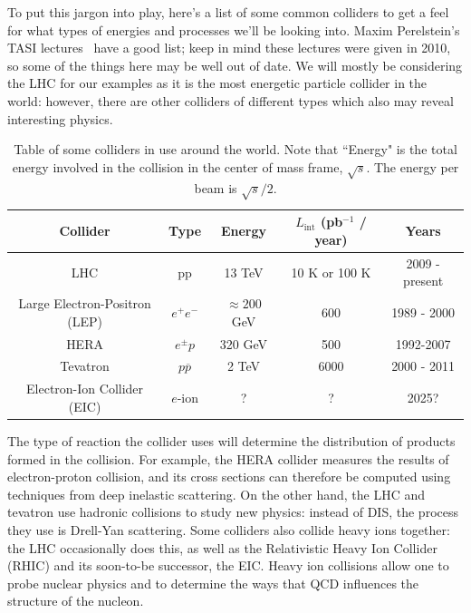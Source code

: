 \documentclass[11pt, oneside]{article}   	%
\theoremstyle{definition}
\numberwithin{equation}{subsection}		%
\begin{document}
To put this jargon into play, here's a list of some common colliders to get a feel for what types of energies and processes 
we'll be looking into. Maxim Perelstein's TASI lectures~\cite{perelstein} have a good list; keep in mind these lectures were given in 2010, so 
some of the things here may be well out of date. We will mostly be considering the LHC for our examples as it is the most energetic 
particle collider in the world: however, there are other colliders of different types which also may reveal interesting physics.
\begin{table}[H]
	\centering
	\begin{tabular}{ | c | c | c | c | c | }
		\hline
		Collider & Type & Energy & $L_\mathrm{int}$ (pb$^{-1}$ / year) & Years \\
		\hline
		LHC & pp & 13 TeV & 10 K or 100 K & 2009 - present \\
		\hline
		Large Electron-Positron (LEP) & $e^+ e^-$ & $\approx 200$ GeV & 600 & 1989 - 2000 \\
		\hline
		HERA & $e^\pm p$ & 320 GeV & 500 & 1992-2007 \\
		\hline
		Tevatron & $p\overline p$ & 2 TeV & 6000 & 2000 - 2011 \\
		\hline
		Electron-Ion Collider (EIC) & $e$-ion & ? & ? & 2025? \\
		\hline
	\end{tabular}
	\caption{Table of some colliders in use around the world. Note that ``Energy" is the total energy involved in the collision in the 
	center of mass frame, $\sqrt s$. The energy per beam is $\sqrt s / 2$.}
	\label{table:colliders}
\end{table}

The type of reaction the collider uses will determine the distribution of products formed in the collision. For example, the HERA collider 
measures the results of electron-proton collision, and its cross sections can therefore be computed using techniques from deep inelastic 
scattering. On the other hand, the LHC and tevatron use hadronic collisions to study new physics: instead of DIS, the process they 
use is Drell-Yan scattering. Some colliders also collide heavy ions together: the LHC occasionally does this, as well as the Relativistic Heavy 
Ion Collider (RHIC) and its soon-to-be successor, the EIC. Heavy ion collisions allow one to probe nuclear physics and to determine the 
ways that QCD influences the structure of the nucleon. 
\end{document}
